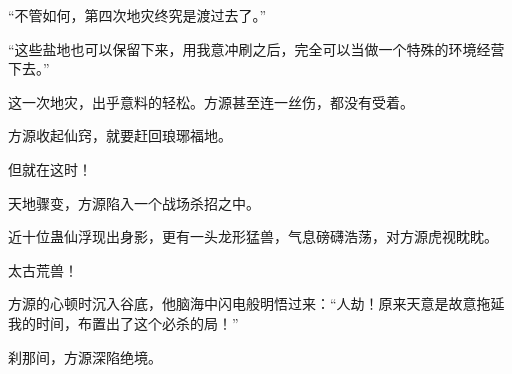 \begin{this_body}
“不管如何，第四次地灾终究是渡过去了。”

“这些盐地也可以保留下来，用我意冲刷之后，完全可以当做一个特殊的环境经营下去。”

这一次地灾，出乎意料的轻松。方源甚至连一丝伤，都没有受着。

方源收起仙窍，就要赶回琅琊福地。

但就在这时！

天地骤变，方源陷入一个战场杀招之中。

近十位蛊仙浮现出身影，更有一头龙形猛兽，气息磅礴浩荡，对方源虎视眈眈。

太古荒兽！

方源的心顿时沉入谷底，他脑海中闪电般明悟过来：“人劫！原来天意是故意拖延我的时间，布置出了这个必杀的局！”

刹那间，方源深陷绝境。

\end{this_body}

